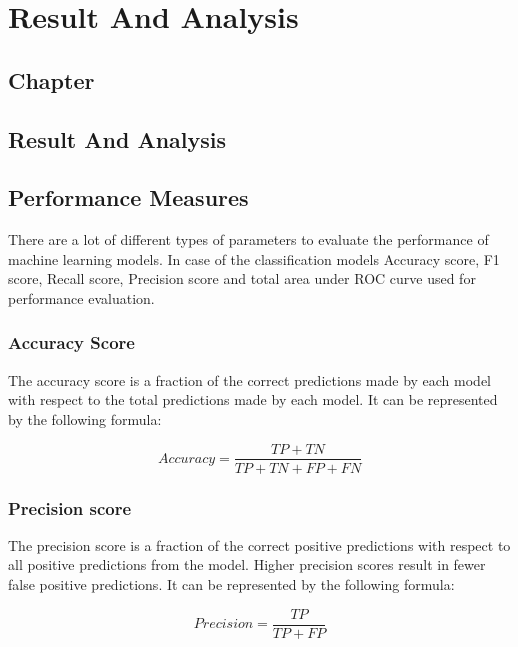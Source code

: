\thispagestyle{fancy}
\chapter{Result And Analysis} \label{ch:result_and_analysis}
\section*{\centering Chapter \thechapter}
\section*{\centering Result And Analysis}

\section{Performance Measures} \label{sec:performance_measures}

There are a lot of different types of parameters to evaluate the performance of machine learning models. In case of the classification models Accuracy score, F1 score, Recall score, Precision score and total area under ROC curve used for performance evaluation.

\subsection{Accuracy Score}\label{subsec:accuracy_score}

The accuracy score is a fraction of the correct predictions made by each model with respect to the total predictions made by each model. It can be represented by the following formula:

\begin{equation}\label{eq:accuracy_score}
  Accuracy = \frac{TP+TN}{TP+TN+FP+FN}
\end{equation}

\subsection{Precision score}\label{subsec:precision_score}

The precision score is a fraction of the correct positive predictions with respect to all positive predictions from the model. Higher precision scores result in fewer false positive predictions. It can be represented by the following formula:

\begin{equation}\label{eq:precision_score}
  Precision = \frac{TP}{TP+FP}
\end{equation}

